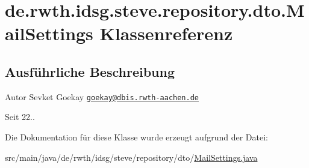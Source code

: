 \hypertarget{classde_1_1rwth_1_1idsg_1_1steve_1_1repository_1_1dto_1_1_mail_settings}{\section{de.\+rwth.\+idsg.\+steve.\+repository.\+dto.\+Mail\+Settings Klassenreferenz}
\label{classde_1_1rwth_1_1idsg_1_1steve_1_1repository_1_1dto_1_1_mail_settings}
}


\subsection{Ausführliche Beschreibung}
\begin{DoxyAuthor}{Autor}
Sevket Goekay \href{mailto:goekay@dbis.rwth-aachen.de}{\tt goekay@dbis.\+rwth-\/aachen.\+de} 
\end{DoxyAuthor}
\begin{DoxySince}{Seit}
22.. 
\end{DoxySince}


Die Dokumentation für diese Klasse wurde erzeugt aufgrund der Datei\+:\begin{DoxyCompactItemize}
\item 
src/main/java/de/rwth/idsg/steve/repository/dto/\hyperlink{_mail_settings_8java}{Mail\+Settings.\+java}\end{DoxyCompactItemize}
